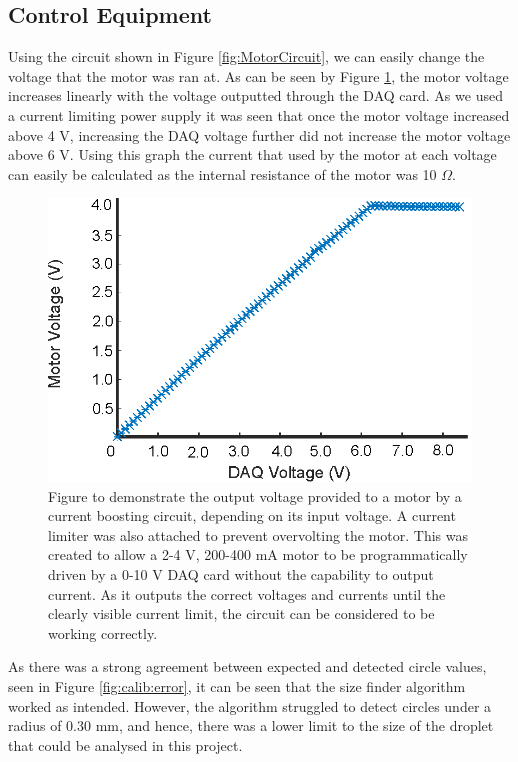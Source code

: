 \documentclass{physics_article_B}
\begin{document}
    \subsection{Control Equipment\label{sect:results:control}}
    
        Using the circuit shown in Figure \ref{fig:MotorCircuit}, we can easily change the voltage that the motor was ran at. As can be seen by Figure \ref{fig:MotorCalib}, the motor voltage increases linearly with the voltage outputted through the DAQ card. As we used a current limiting power supply it was seen that once the motor voltage increased above 4 V, increasing the DAQ voltage further did not increase the motor voltage above 6 V. Using this graph the current that used by the motor at each voltage can easily be calculated as the internal resistance of the motor was 10 $\Omega$.
        
        \begin{figure}[H]
            \centering
            \hspace*{-1cm}\includegraphics{Figures/MotorCalib.eps}
            \caption{Figure to demonstrate the output voltage provided to a motor by a current boosting circuit, depending on its input voltage. A current limiter was also attached to prevent overvolting the motor. This was created to allow a 2-4 V, 200-400 mA motor to be programmatically driven by a 0-10 V DAQ card without the capability to output current. As it outputs the correct voltages and currents until the clearly visible current limit, the circuit can be considered to be working correctly.}\label{fig:MotorCalib}
        \end{figure}
        
        As there was a strong agreement between expected and detected circle values, seen in Figure \ref{fig:calib:error}, it can be seen that the size finder algorithm worked as intended. However, the algorithm struggled to detect circles under a radius of 0.30 mm, and hence, there was a lower limit to the size of the droplet that could be analysed in this project.
        
\end{document}
